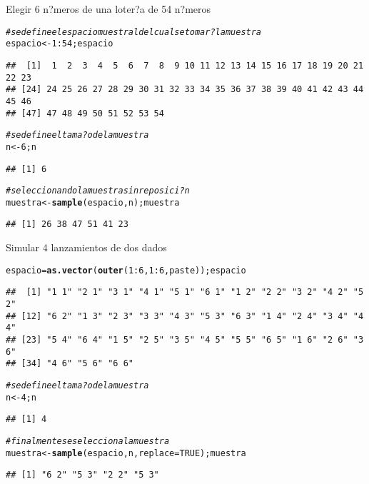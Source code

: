 \documentclass[10pt,a4paper]{article}\usepackage[]{graphicx}\usepackage[]{color}
\makeatletter
\newcommand{\hlnum}[1]{\textcolor[rgb]{0.686,0.059,0.569}{#1}}%
\newcommand{\hlcom}[1]{\textcolor[rgb]{0.678,0.584,0.686}{\textit{#1}}}%
\newcommand{\hlopt}[1]{\textcolor[rgb]{0,0,0}{#1}}%
\newcommand{\hlstd}[1]{\textcolor[rgb]{0.345,0.345,0.345}{#1}}%
\newcommand{\hlkwb}[1]{\textcolor[rgb]{0.69,0.353,0.396}{#1}}%
\newcommand{\hlkwc}[1]{\textcolor[rgb]{0.333,0.667,0.333}{#1}}%
\newcommand{\hlkwd}[1]{\textcolor[rgb]{0.737,0.353,0.396}{\textbf{#1}}}%
\newenvironment{kframe}{%
 \def\at@end@of@kframe{}%
 \ifinner\ifhmode%
  \def\at@end@of@kframe{\end{minipage}}%
  \begin{minipage}{\columnwidth}%
 \fi\fi%
 \def\FrameCommand##1{\hskip\@totalleftmargin \hskip-\fboxsep
 \colorbox{shadecolor}{##1}\hskip-\fboxsep
     \hskip-\linewidth \hskip-\@totalleftmargin \hskip\columnwidth}%
 \MakeFramed {\advance\hsize-\width
   \@totalleftmargin\z@ \linewidth\hsize
   \@setminipage}}%
 {\par\unskip\endMakeFramed%
 \at@end@of@kframe}
\newenvironment{knitrout}{}{} %
\makeatother
\begin{document}
Elegir 6 n?meros de una loter?a de 54 n?meros 
\begin{knitrout}
\color{fgcolor}\begin{kframe}
\begin{alltt}
\hlcom{# se define el espacio muestral del cual se tomar? la muestra}
\hlstd{espacio} \hlkwb{<-} \hlnum{1}\hlopt{:}\hlnum{54}\hlstd{;espacio}
\end{alltt}
\begin{verbatim}
##  [1]  1  2  3  4  5  6  7  8  9 10 11 12 13 14 15 16 17 18 19 20 21 22 23
## [24] 24 25 26 27 28 29 30 31 32 33 34 35 36 37 38 39 40 41 42 43 44 45 46
## [47] 47 48 49 50 51 52 53 54
\end{verbatim}
\begin{alltt}
\hlcom{# se define el tama?o de la muestra }
\hlstd{n} \hlkwb{<-} \hlnum{6}\hlstd{; n}
\end{alltt}
\begin{verbatim}
## [1] 6
\end{verbatim}
\begin{alltt}
\hlcom{#seleccionando la muestra sin reposici?n }
\hlstd{muestra} \hlkwb{<-} \hlkwd{sample}\hlstd{(espacio, n); muestra}
\end{alltt}
\begin{verbatim}
## [1] 26 38 47 51 41 23
\end{verbatim}
\end{kframe}
\end{knitrout}

Simular 4 lanzamientos de dos dados 
\begin{knitrout}
\color{fgcolor}\begin{kframe}
\begin{alltt}
\hlstd{espacio} \hlkwb{=} \hlkwd{as.vector}\hlstd{(}\hlkwd{outer}\hlstd{(}\hlnum{1}\hlopt{:}\hlnum{6}\hlstd{,} \hlnum{1}\hlopt{:}\hlnum{6}\hlstd{, paste)); espacio}
\end{alltt}
\begin{verbatim}
##  [1] "1 1" "2 1" "3 1" "4 1" "5 1" "6 1" "1 2" "2 2" "3 2" "4 2" "5 2"
## [12] "6 2" "1 3" "2 3" "3 3" "4 3" "5 3" "6 3" "1 4" "2 4" "3 4" "4 4"
## [23] "5 4" "6 4" "1 5" "2 5" "3 5" "4 5" "5 5" "6 5" "1 6" "2 6" "3 6"
## [34] "4 6" "5 6" "6 6"
\end{verbatim}
\begin{alltt}
\hlcom{# se define el tama?o de la muestra }
\hlstd{n} \hlkwb{<-} \hlnum{4}\hlstd{; n}
\end{alltt}
\begin{verbatim}
## [1] 4
\end{verbatim}
\begin{alltt}
\hlcom{# finalmente se selecciona la muestra }
\hlstd{muestra} \hlkwb{<-} \hlkwd{sample}\hlstd{(espacio, n,} \hlkwc{replace}\hlstd{=}\hlnum{TRUE}\hlstd{); muestra}
\end{alltt}
\begin{verbatim}
## [1] "6 2" "5 3" "2 2" "5 3"
\end{verbatim}
\end{kframe}
\end{knitrout}
\end{document}
